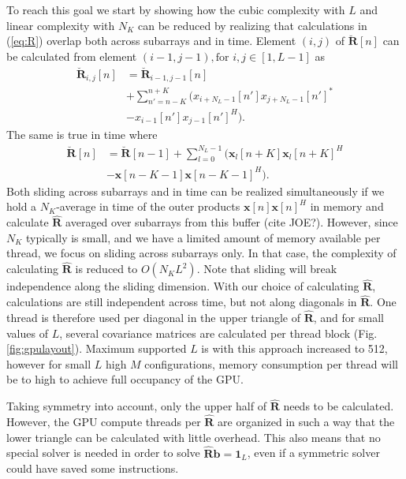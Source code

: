\documentclass[12pt,journal,onecolumn]{IEEEtran}
\newcommand{\mat}[1]{\mathbf{#1}}
\renewcommand{\vec}[1]{\mathbf{#1}}
\begin{document}
To reach this goal we start by showing how the cubic complexity with $L$ and linear complexity with $N_K$ can be reduced by realizing that calculations in (\ref{eq:R}) overlap both across subarrays and in time. Element $(i,j)$ of $\mat{\breve{R}}[n]$ can be calculated from element $(i-1, j-1), \text{for } i,j \in [1, L-1]$ as
\begin{align}
\mat{\breve{R}}_{i,j}[n] &=  \mat{\breve{R}}_{i-1,j-1}[n]  \nonumber \\
&+ \sum_{n'=n-K}^{n+K} (x_{i+N_L-1}[n']x_{j+N_L-1}[n']^* \nonumber \\
&- x_{i-1}[n']x_{j-1}[n']^H). \label{eq:sliding}
\end{align}
The same is true in time where
\begin{align}
\mat{\breve{R}}[n] &= \mat{\breve{R}}[n-1] + \sum_{l=0}^{N_L-1} (\vec{x}_l[n+K]\vec{x}_l[n+K]^H \nonumber \\
&- \vec{x}[n-K-1]\vec{x}[n-K-1]^H).
\end{align}
Both sliding across subarrays and in time can be realized simultaneously if we hold a $N_K$-average in time of the outer products $\vec{x}[n]\vec{x}[n]^H$ in memory and calculate $\mat{\hat{R}}$ averaged over subarrays from this buffer (cite JOE?). However, since $N_K$ typically is small, and we have a limited amount of memory available per thread, we focus on sliding across subarrays only. In that case, the complexity of calculating $\mat{\hat{R}}$ is reduced to $O(N_KL^2)$. Note that sliding will break independence along the sliding dimension. With our choice of calculating $\mat{\hat{R}}$, calculations are still independent across time, but not along diagonals in $\mat{\hat{R}}$. One thread is therefore used per diagonal in the upper triangle of $\mat{\hat{R}}$, and for small values of $L$, several covariance matrices are calculated per thread block (Fig. \ref{fig:gpulayout}). Maximum supported $L$ is with this approach increased to 512, however for small $L$ high $M$ configurations, memory consumption per thread will be to high to achieve full occupancy of the GPU.

Taking symmetry into account, only the upper half of $\mat{\hat{R}}$ needs to be calculated. However, the GPU compute threads per $\mat{\hat{R}}$ are organized in such a way that the lower triangle can be calculated with little overhead. This also means that no special solver is needed in order to solve $\mat{\hat{R}}\vec{b} = \vec{1}_L$, even if a symmetric solver could have saved some instructions.
\end{document}
